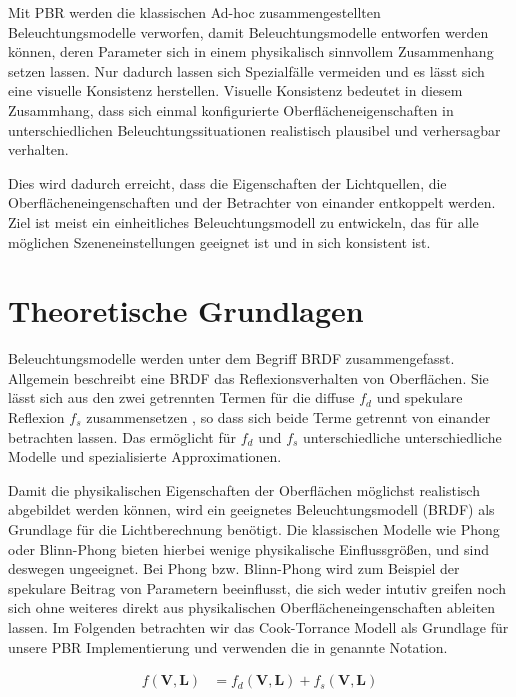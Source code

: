 Mit \ac{PBR} werden die klassischen Ad-hoc zusammengestellten Beleuchtungsmodelle verworfen, damit Beleuchtungsmodelle entworfen werden können, deren Parameter sich in einem physikalisch sinnvollem Zusammenhang setzen lassen. Nur dadurch lassen sich Spezialfälle vermeiden und es lässt sich eine visuelle Konsistenz herstellen. Visuelle Konsistenz bedeutet in diesem Zusammhang, dass sich einmal konfigurierte Oberflächeneigenschaften in unterschiedlichen Beleuchtungssituationen realistisch plausibel und verhersagbar verhalten. 

Dies wird dadurch erreicht, dass die Eigenschaften der Lichtquellen, die Oberflächeneingenschaften und der Betrachter von einander entkoppelt werden. Ziel ist meist ein einheitliches Beleuchtungsmodell zu entwickeln, das für alle möglichen Szeneneinstellungen geeignet ist und in sich konsistent ist.

\section{Theoretische Grundlagen}
\label{sec:pbr-grundlagen}

Beleuchtungsmodelle werden unter dem Begriff \acf{BRDF} zusammengefasst. Allgemein beschreibt eine \ac{BRDF} das Reflexionsverhalten von Oberflächen. Sie lässt sich aus den zwei getrennten Termen für die diffuse $f_d$ und spekulare Reflexion $f_s$ zusammensetzen \parencite[Kapitel 3.1.2, Seite 7]{Rousiers2014}, so dass sich beide Terme getrennt von einander betrachten lassen. Das ermöglicht für $f_d$ und $f_s$ unterschiedliche unterschiedliche Modelle und spezialisierte Approximationen.

Damit die physikalischen Eigenschaften der Oberflächen möglichst realistisch abgebildet werden können, wird ein geeignetes Beleuchtungsmodell (\acf{BRDF}) als Grundlage für die Lichtberechnung benötigt. Die klassischen Modelle wie Phong oder Blinn-Phong bieten hierbei wenige physikalische Einflussgrößen, und sind deswegen ungeeignet. Bei Phong bzw. Blinn-Phong wird zum Beispiel der spekulare Beitrag von Parametern beeinflusst, die sich weder intutiv greifen noch sich ohne weiteres direkt aus physikalischen Oberflächeneingenschaften ableiten lassen. Im Folgenden betrachten wir das Cook-Torrance Modell als Grundlage für unsere \ac{PBR} Implementierung und verwenden die in  genannte Notation.

\begin{align}
	\label{eq:brdf-dekonstruiert}
	f(\mathbf V,\mathbf L) &= f_d(\mathbf V,\mathbf L) + f_s(\mathbf V,\mathbf L)\\
\end{align}

